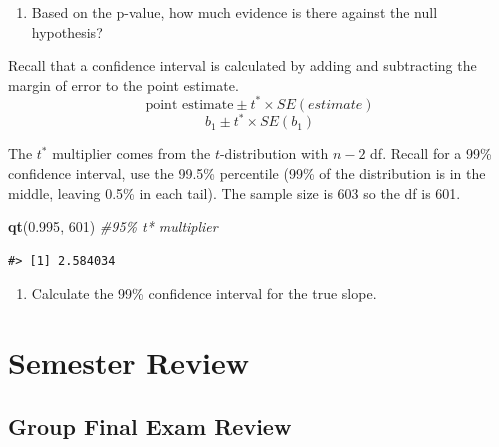 \documentclass[
]{report}
\newenvironment{Shaded}{\begin{snugshade}}{\end{snugshade}}
\newcommand{\CommentTok}[1]{\textcolor[rgb]{0.56,0.35,0.01}{\textit{#1}}}
\newcommand{\DecValTok}[1]{\textcolor[rgb]{0.00,0.00,0.81}{#1}}
\newcommand{\FloatTok}[1]{\textcolor[rgb]{0.00,0.00,0.81}{#1}}
\newcommand{\FunctionTok}[1]{\textcolor[rgb]{0.13,0.29,0.53}{\textbf{#1}}}
\newcommand{\NormalTok}[1]{#1}
\providecommand{\tightlist}{%
  \setlength{\itemsep}{0pt}\setlength{\parskip}{0pt}}
\begin{document}
\begin{enumerate}
\def\labelenumi{\arabic{enumi}.}
\setcounter{enumi}{14}
\tightlist
\item
  Based on the p-value, how much evidence is there against the null hypothesis?
\end{enumerate}

\vspace{0.5in}

Recall that a confidence interval is calculated by adding and subtracting the margin of error to the point estimate.\\
\[\mbox{point estimate}\pm t^* \times SE(estimate)\]
\[b_1 \pm t^* \times SE(b_1)\]

The \(t^*\) multiplier comes from the \(t\)-distribution with \(n-2\) df. Recall for a 99\% confidence interval, use the 99.5\% percentile (99\% of the distribution is in the middle, leaving 0.5\% in each tail). The sample size is 603 so the df is 601.

\begin{Shaded}
\begin{Highlighting}[]
\FunctionTok{qt}\NormalTok{(}\FloatTok{0.995}\NormalTok{, }\DecValTok{601}\NormalTok{) }\CommentTok{\#95\% t* multiplier }
\end{Highlighting}
\end{Shaded}

\begin{verbatim}
#> [1] 2.584034
\end{verbatim}

\begin{enumerate}
\def\labelenumi{\arabic{enumi}.}
\setcounter{enumi}{15}
\tightlist
\item
  Calculate the 99\% confidence interval for the true slope.
  \vspace{1in}
\end{enumerate}

\newpage

\chapter{Semester Review}\label{semester-review}

\section{Group Final Exam Review}\label{group-final-exam-review}

\end{document}
